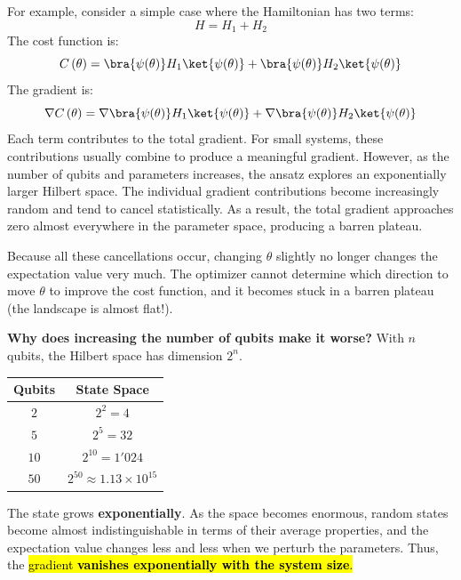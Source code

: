 \begin{itemize}
    \begin{examplebox}
        For example, consider a simple case where the Hamiltonian has two terms:
        \begin{equation*}
            H = H_1 + H_2
        \end{equation*}
        The cost function is:
        \begin{equation*}
            C\left(\theta\right) = \bra{\psi(\theta)} H_1 \ket{\psi(\theta)} + \bra{\psi(\theta)} H_2 \ket{\psi(\theta)}
        \end{equation*}
        The gradient is:
        \begin{equation*}
            \nabla C\left(\theta\right) = \nabla \bra{\psi(\theta)} H_1 \ket{\psi(\theta)} + \nabla \bra{\psi(\theta)} H_2 \ket{\psi(\theta)}
        \end{equation*}
        Each term contributes to the total gradient. For small systems, these contributions usually combine to produce a meaningful gradient. However, as the number of qubits and parameters increases, the ansatz explores an exponentially larger Hilbert space. The individual gradient contributions become increasingly random and tend to cancel statistically. As a result, the total gradient approaches zero almost everywhere in the parameter space, producing a barren plateau.
    \end{examplebox}

    Because all these cancellations occur, changing $\theta$ slightly no longer changes the expectation value very much. The optimizer cannot determine which direction to move $\theta$ to improve the cost function, and it becomes stuck in a barren plateau (the landscape is almost flat!).

    \textcolor{Green3}{ \textbf{Why does increasing the number of qubits make it worse?}} With $n$ qubits, the Hilbert space has dimension $2^n$.
    \begin{center}
        \begin{tabular}{@{} c c @{}}
            \toprule
            \textbf{Qubits} & \textbf{State Space} \\
            \midrule
            $2$ & $2^2 = 4$ \\
            $5$ & $2^5 = 32$ \\
            $10$ & $2^{10} = 1'024$ \\
            $50$ & $2^{50} \approx 1.13 \times 10^{15}$ \\
            \bottomrule
        \end{tabular}
    \end{center}

    The state grows \textbf{exponentially}. As the space becomes enormous, random states become almost indistinguishable in terms of their average properties, and the expectation value changes less and less when we perturb the parameters. Thus, the \hl{gradient \textbf{vanishes exponentially with the system size}.}
\end{itemize}
